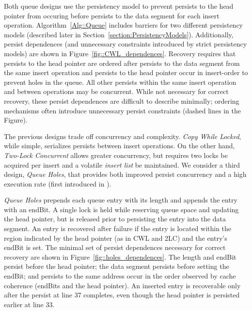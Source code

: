 

Both queue designs use the persistency model to prevent persists to the head pointer from occuring before persists to the data segment for each insert operation.
Algorithm~\ref{Alg::Queue} includes barriers for two different persistency models (described later in Section~\ref{section:PersistencyModels}).
Additionally, persist dependences (and unnecessary constraints introduced by strict persistency models) are shown in Figure~\ref{fig::CWL_dependences}.
Recovery requires that persists to the head pointer are ordered after persists to the data segment from the same insert operation and persists to the head pointer occur in insert-order to prevent holes in the queue.
All other persists within the same insert operation and between operations may be concurrent.
While not necessary for correct recovery, these persist dependences are difficult to describe minimally; ordering mechanisms often introduce unnecessary persist constraints (dashed lines in the Figure).

The previous designs trade off concurrency and complexity.
\emph{Copy While Locked}, while simple, serializes persists between insert operations.
On the other hand, \emph{Two-Lock Concurrent} allows greater concurrency, but requires two locks be acquired per insert and a volatile \emph{insert list} be maintained.
We consider a third design, \emph{Queue Holes}, that provides both improved persist concurrency and a high execution rate (first introduced in \cite{FangHsiao11}).



\emph{Queue Holes} prepends each queue entry with its length and appends the entry with an endBit.
A single lock is held while reserving queue space and updating the head pointer, but is released prior to persisting the entry into the data segment.
An entry is recovered after failure if the entry is located within the region indicated by the head pointer (as in CWL and 2LC) and the entry's endBit is set.
The minimal set of persist dependences necessary for correct recovery are shown in Figure~\ref{fig::holes_dependences}.
The length and endBit persist before the head pointer; the data segment persists before setting the endBit; and persists to the same address occur in the order observed by cache coherence (endBits and the head pointer).
An inserted entry is recoverable only after the persist at line 37 completes, even though the head pointer is persisted earlier at line 33.

